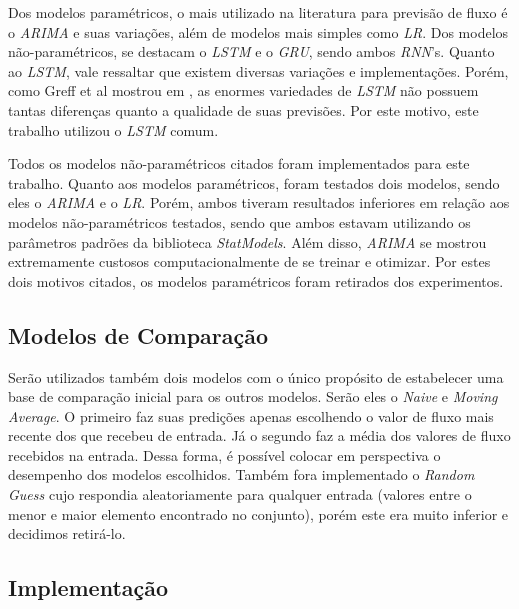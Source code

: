 Dos modelos paramétricos, o mais utilizado na literatura para previsão de fluxo é o \textit{\acrfull{ARIMA}} e suas variações, além de modelos mais simples como \textit{\acrfull{LR}}. Dos modelos não-paramétricos, se destacam o \textit{\acrfull{LSTM}} e o \textit{\acrfull{GRU}}, sendo ambos \textit{\acrshort{RNN}}'s. Quanto ao \textit{\acrfull{LSTM}}, vale ressaltar que existem diversas variações e implementações. Porém, como Greff et al mostrou em \cite{Greff_2015}, as enormes variedades de \textit{\acrshort{LSTM}} não possuem tantas diferenças quanto a qualidade de suas previsões. Por este motivo, este trabalho utilizou o \textit{\acrfull{LSTM}} comum.


Todos os modelos não-paramétricos citados foram implementados para este trabalho. Quanto aos modelos paramétricos, foram testados dois modelos, sendo eles o \textit{\acrshort{ARIMA}} e o \textit{\acrshort{LR}}. Porém, ambos tiveram resultados inferiores em relação aos modelos não-paramétricos testados, sendo que ambos estavam utilizando os parâmetros padrões da biblioteca \textit{StatModels}. Além disso, \textit{\acrshort{ARIMA}} se mostrou extremamente custosos computacionalmente de se treinar e otimizar. Por estes dois motivos citados, os modelos paramétricos foram retirados dos experimentos.

\subsection{Modelos de Comparação}

Serão utilizados também dois modelos com o único propósito de estabelecer uma base de comparação inicial para os outros modelos. Serão eles o \textit{Naive} e \textit{Moving Average}. O primeiro faz suas predições apenas escolhendo o valor de fluxo mais recente dos que recebeu de entrada. Já o segundo faz a média dos valores de fluxo recebidos na entrada. Dessa forma, é possível colocar em perspectiva o desempenho dos modelos escolhidos. Também fora implementado o \textit{Random Guess} cujo respondia aleatoriamente para qualquer entrada (valores entre o menor e maior elemento encontrado no conjunto), porém este era muito inferior e decidimos retirá-lo.

\subsection{Implementação}

